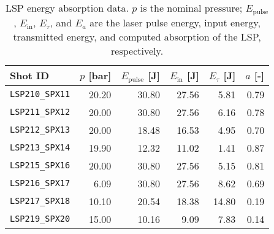 \begin{table}[h]
\centering
\caption[LSP energy absorption data]{LSP energy absorption data. $p$ is the nominal pressure; $E_\mathrm{pulse}$, $E_\mathrm{in}$, $E_\tau$, and $E_a$ are the laser pulse energy, input energy, transmitted energy, and computed absorption of the LSP, respectively.}
\label{tab:LSP_absorption}
\begin{tabular}{@{}lrrrrr@{}}
\toprule
Shot ID & $p$ [bar] & $E_\mathrm{pulse}$ [J] & $E_\mathrm{in}$ [J] & $E_\tau$ [J] & $a$ [-] \\
\midrule
\verb|LSP210_SPX11| &     20.20 &                  30.80 &               27.56 &         5.81 &    0.79 \\
\verb|LSP211_SPX12| &     20.00 &                  30.80 &               27.56 &         6.16 &    0.78 \\
\verb|LSP212_SPX13| &     20.00 &                  18.48 &               16.53 &         4.95 &    0.70 \\
\verb|LSP213_SPX14| &     19.90 &                  12.32 &               11.02 &         1.41 &    0.87 \\
\verb|LSP215_SPX16| &     20.00 &                  30.80 &               27.56 &         5.15 &    0.81 \\
\verb|LSP216_SPX17| &      6.09 &                  30.80 &               27.56 &         8.62 &    0.69 \\
\verb|LSP217_SPX18| &     10.10 &                  20.54 &               18.38 &        14.80 &    0.19 \\
\verb|LSP219_SPX20| &     15.00 &                  10.16 &                9.09 &         7.83 &    0.14 \\
\bottomrule
\end{tabular}
\end{table}
